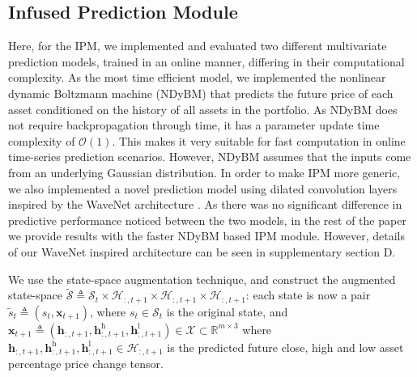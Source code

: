 \documentclass{article}
\begin{document}
\subsection{Infused Prediction Module}\label{sec3.1}
Here, for the IPM, we implemented and evaluated two different multivariate prediction models, trained in an online manner, differing in their computational complexity. As the most time efficient model, we implemented the nonlinear dynamic Boltzmann machine \cite{dasgupta2017nonlinear} (NDyBM) that predicts the future price of each asset conditioned on the history of all assets in the portfolio. As NDyBM does not require backpropagation through time, it has a parameter update time complexity of $\mathcal{O}(1)$. This makes it very suitable for fast computation in online time-series prediction scenarios. However, NDyBM assumes that the inputs come from an underlying Gaussian distribution. In order to make IPM more generic, we also implemented a novel prediction model using dilated convolution layers inspired by the WaveNet architecture \cite{pmlr-v80-oord18a}. As there was no significant difference in predictive performance noticed between the two models, in the rest of the paper we provide results with the faster NDyBM based IPM module. However, details of our WaveNet inspired architecture can be seen in supplementary section D. 

We use the state-space augmentation technique, and construct the augmented state-space $\widetilde{\mathcal{S}}\triangleq\mathcal{S}_t\times\mathcal{H}_{:,t+1}\times\mathcal{H}_{:,t+1}\times\mathcal{H}_{:,t+1}$: each state is now a pair $\tilde{s}_t\triangleq(s_t,\mathbf{x}_{t+1})$, where $s_t\in\mathcal{S}_t$ is the original state, and $\mathbf{x}_{t+1}\triangleq(\mathbf{h}_{:,t+1}, \mathbf{h}^{\text{h}}_{:,t+1}, \mathbf{h}^{\text{l}}_{:,t+1})\in\mathcal{X}\subset\mathbb{R}^{m\times 3}$ where $\mathbf{h}_{:,t+1}, \mathbf{h}^{\text{h}}_{:,t+1}, \mathbf{h}^{\text{l}}_{:,t+1}\in\mathcal{H}_{:,t+1}$ is the predicted future close, high and low asset percentage price change tensor. 
\end{document}
